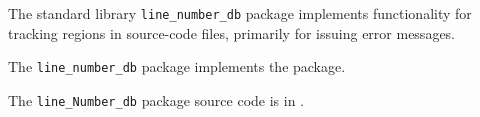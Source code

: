 
The standard library {\tt line\_number\_db} package implements functionality for tracking 
regions in source-code files, primarily for issuing error messages.

The {\tt line\_number\_db} package implements the  package.

The {\tt line\_Number\_db} package source code is in .
